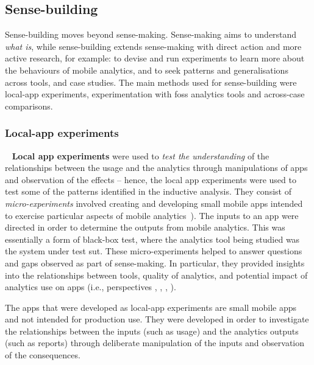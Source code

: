 \subsection{Sense-building}
Sense-building moves beyond sense-making. Sense-making aims to understand \textit{what is}, while sense-building extends sense-making with direct action and more active research, for example: to devise and run experiments to learn more about the behaviours of mobile analytics, and to seek patterns and generalisations across tools, and case studies. The main methods used for sense-building were local-app experiments, experimentation with \Gls{foss} analytics tools and across-case comparisons. 

\subsubsection{Local-app experiments}~\label{local-app-experiments-research-method} 
\textbf{Local app experiments} were used to \textit{test the understanding} of the relationships between the usage and the analytics through manipulations of apps and observation of the effects -- hence, the local app experiments were used to test some of the patterns identified in the inductive analysis. They consist of \textit{micro-experiments} involved creating and developing small mobile apps intended to exercise particular aspects of mobile analytics~). The inputs to an app were directed in order to determine the outputs from mobile analytics. This was essentially a form of black-box test, where the analytics tool being studied was the system under test \acrfull{sut}. These micro-experiments helped to answer questions and gaps observed as part of sense-making.  In particular, they provided insights into the relationships between tools, quality of analytics, and potential impact of analytics use on apps (i.e., perspectives \uartefacts, \utools, \iartefacts, \itools). 

The apps that were developed as local-app experiments are small mobile apps and not intended for production use. They were developed in order to investigate the relationships between the inputs (such as usage) and the analytics outputs (such as reports) through deliberate manipulation of the inputs and observation of the consequences.  

